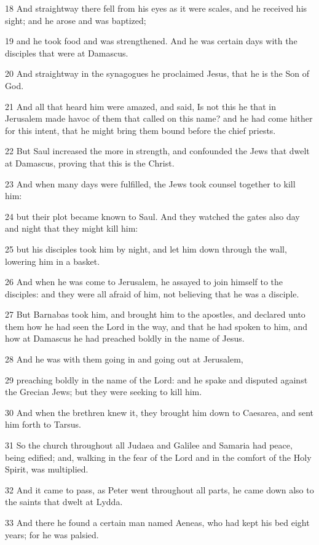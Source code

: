 \par 18 And straightway there fell from his eyes as it were scales, and he received his sight; and he arose and was baptized;
\par 19 and he took food and was strengthened. And he was certain days with the disciples that were at Damascus.
\par 20 And straightway in the synagogues he proclaimed Jesus, that he is the Son of God.
\par 21 And all that heard him were amazed, and said, Is not this he that in Jerusalem made havoc of them that called on this name? and he had come hither for this intent, that he might bring them bound before the chief priests.
\par 22 But Saul increased the more in strength, and confounded the Jews that dwelt at Damascus, proving that this is the Christ.
\par 23 And when many days were fulfilled, the Jews took counsel together to kill him:
\par 24 but their plot became known to Saul. And they watched the gates also day and night that they might kill him:
\par 25 but his disciples took him by night, and let him down through the wall, lowering him in a basket.
\par 26 And when he was come to Jerusalem, he assayed to join himself to the disciples: and they were all afraid of him, not believing that he was a disciple.
\par 27 But Barnabas took him, and brought him to the apostles, and declared unto them how he had seen the Lord in the way, and that he had spoken to him, and how at Damascus he had preached boldly in the name of Jesus.
\par 28 And he was with them going in and going out at Jerusalem,
\par 29 preaching boldly in the name of the Lord: and he spake and disputed against the Grecian Jews; but they were seeking to kill him.
\par 30 And when the brethren knew it, they brought him down to Caesarea, and sent him forth to Tarsus.
\par 31 So the church throughout all Judaea and Galilee and Samaria had peace, being edified; and, walking in the fear of the Lord and in the comfort of the Holy Spirit, was multiplied.
\par 32 And it came to pass, as Peter went throughout all parts, he came down also to the saints that dwelt at Lydda.
\par 33 And there he found a certain man named Aeneas, who had kept his bed eight years; for he was palsied.
